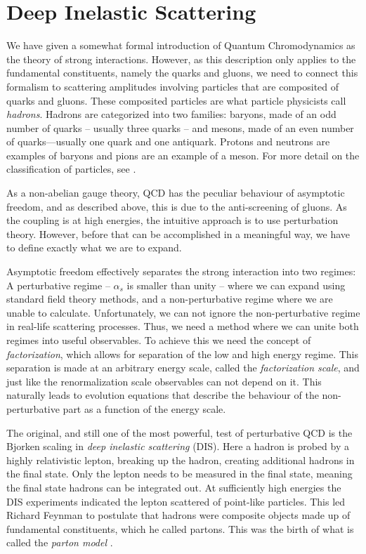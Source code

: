 \section{Deep Inelastic Scattering}\label{sec:DIS}
We have given a somewhat formal introduction of Quantum Chromodynamics as the theory of strong interactions. However, as this description only applies to the fundamental constituents, namely the quarks and gluons, we need to connect this formalism to scattering amplitudes involving particles that are composited of quarks and gluons. These composited particles are what particle physicists call \emph{hadrons}. Hadrons are categorized into two families: baryons, made of an odd number of quarks – usually three quarks – and mesons, made of an even number of quarks—usually one quark and one antiquark. Protons and neutrons are examples of baryons and pions are an example of a meson. For more detail on the classification of particles, see \cite{PhysRevD.98.030001}.

\medskip
As a non-abelian gauge theory, QCD has the peculiar behaviour of asymptotic freedom, and as described above, this is due to the anti-screening of gluons. As the coupling is  at high energies, the intuitive approach is to use perturbation theory. However, before that can be accomplished in a meaningful way, we have to define exactly what we are to expand.

Asymptotic freedom effectively separates the strong interaction into two regimes: A perturbative regime -- $\alpha_s$ is smaller than unity -- where we can expand using standard field theory methods, and a non-perturbative regime where we are unable to calculate. Unfortunately, we can not ignore the non-perturbative regime in real-life scattering processes. Thus, we need a method where we can unite both regimes into useful observables. To achieve this we need the concept of \emph{factorization}, which allows for separation of the low and high energy regime. This separation is made at an arbitrary energy scale, called the \emph{factorization scale}, and just like the renormalization scale observables can not depend on it. This naturally leads to evolution equations that describe the behaviour of the non-perturbative part as a function of the energy scale.

\medskip
The original, and still one of the most powerful, test of perturbative QCD is the Bjorken scaling in \emph{deep inelastic scattering} (DIS). Here a hadron is probed by a highly relativistic lepton, breaking up the hadron, creating additional hadrons in the final state. Only the lepton needs to be measured in the final state, meaning the final state hadrons can be integrated out. At sufficiently high energies the DIS experiments indicated the lepton scattered of point-like particles. This led Richard Feynman to postulate that hadrons were composite objects made up of fundamental constituents, which he called partons. This was the birth of what is called the \emph{parton model} \cite{Feynman:1970fm}. 

